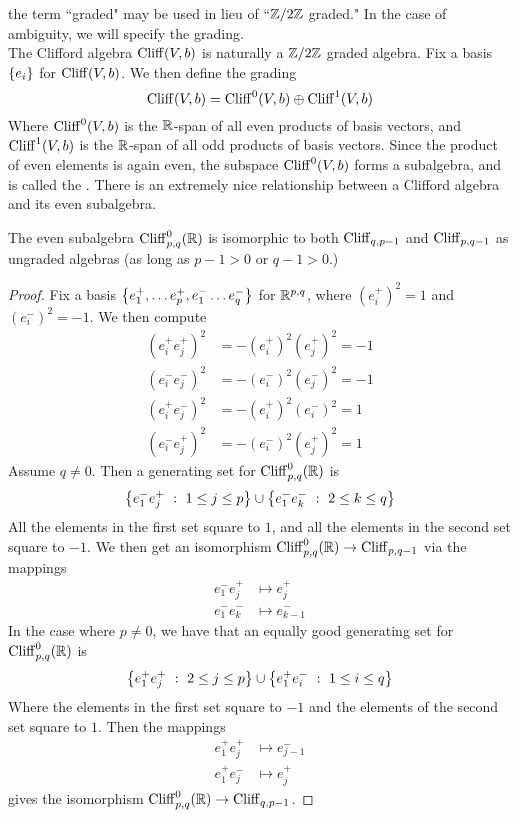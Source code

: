 the term ``graded" may be used in lieu of ``$\mathbb{Z}/2\mathbb{Z}$ graded." In the case of
ambiguity, we will specify the grading. \\
The Clifford algebra $\operatorname{Cliff}(V,b)$ is naturally a $\mathbb{Z}/2\mathbb{Z}$ graded algebra. Fix
a basis $\left\lbrace e_i \right\rbrace$ for $\operatorname{Cliff}(V,b)$. We then define the grading
\[
\operatorname{Cliff}(V,b) = \operatorname{Cliff}^0(V,b) \oplus \operatorname{Cliff}^1(V,b)
\]
Where $\operatorname{Cliff}^0(V,b)$ is the $\mathbb{R}$-span of all even products of basis vectors,
and $\operatorname{Cliff}^1(V,b)$ is the $\mathbb{R}$-span of all odd products of basis vectors.
Since the product of even elements is again even, the subspace
$\operatorname{Cliff}^0(V,b)$ forms a subalgebra, and is called the . There is an extremely nice relationship between a Clifford algebra
and its even subalgebra.
%
\begin{thm}
The even subalgebra $\operatorname{Cliff}_{p,q}^0(\mathbb{R})$ is isomorphic to both $\operatorname{Cliff}_{q, p-1}$
and $\operatorname{Cliff}_{p,q-1}$ as ungraded algebras (as long as $p-1 > 0$ or $q-1 > 0$.)
\end{thm}
%
\begin{proof}
Fix a basis $\left\lbrace e_1^+, \ldots e_p^+, e_1^- \ldots e_q^- \right\rbrace$ for $\mathbb{R}^{p,q}$, where
$(e_i^+)^2 = 1$ and $(e_i^-)^2 = -1$. We then compute
%
\begin{align*}
(e_i^+e_j^+)^2 &= -(e_i^+)^2(e_j^+)^2 = -1 \\
(e_i^-e_j^-)^2 &= -(e_i^-)^2(e_j^-)^2 = -1 \\
(e_i^+e_j^-)^2 &= -(e_i^+)^2(e_i^-)^2 = 1 \\
(e_i^-e_j^+)^2 &= -(e_i^-)^2(e_j^+)^2 = 1
\end{align*}
%
Assume $q \neq 0$. Then a generating set for $\operatorname{Cliff}_{p,q}^0(\mathbb{R})$ is
\[
\left\lbrace e_1^-e_j^+ ~:~ 1 \leq j \leq p \right\rbrace \cup \left\lbrace e_1^-e_k^- ~:~ 2 \leq k \leq q \right\rbrace
\]
All the elements in the first set square to $1$, and all the elements in the
second set square to $-1$. We then get an isomorphism
$\operatorname{Cliff}^0_{p,q}(\mathbb{R}) \to \operatorname{Cliff}_{p,q-1}$ via the mappings
\begin{align*}
e_1^-e_j^+ &\mapsto e_j^+ \\
e_1^-e_k^- &\mapsto e_{k-1}^-
\end{align*}
In the case where $p \neq 0$, we have that an equally good generating set for
$\operatorname{Cliff}_{p,q}^0(\mathbb{R})$ is
\[
\left\lbrace e^+_1e_j^+ ~:~ 2 \leq j \leq p \right\rbrace \cup \left\lbrace e_1^+e_i^- ~:~ 1 \leq i \leq q \right\rbrace
\]
Where the elements in the first set square to $-1$ and the elements of the second
set square to $1$. Then the mappings
\begin{align*}
e_1^+e_j^+ &\mapsto e_{j-1}^- \\
e_1^+e_j^- &\mapsto e_j^+
\end{align*}
gives the isomorphism $\operatorname{Cliff}_{p,q}^0(\mathbb{R}) \to \operatorname{Cliff}_{q, p-1}$.
\end{proof}
